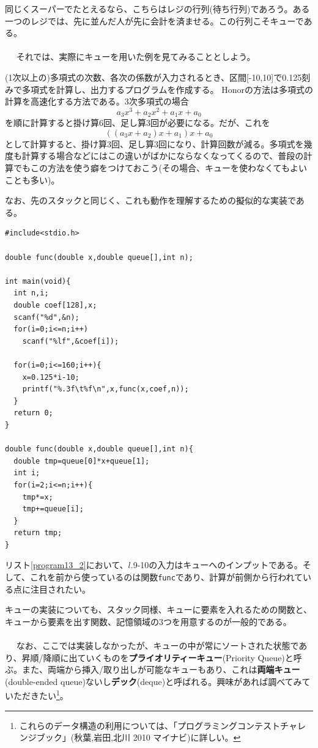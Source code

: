 同じくスーパーでたとえるなら、こちらはレジの行列(待ち行列)であろう。ある一つのレジでは、先に並んだ人が先に会計を済ませる。この行列こそキューである。
\\ \\　
それでは、実際にキューを用いた例を見てみることとしよう。
\begin{boxnote}
\begin{multicols}{2}
(1次以上の)多項式の次数、各次の係数が入力されるとき、区間[-10,10]で0.125刻みで多項式を計算し、出力するプログラムを作成する。
Honorの方法は多項式の計算を高速化する方法である。3次多項式の場合
\[
a_3x^3+a_2x^2+a_1x+a_0
\]
を順に計算すると掛け算6回、足し算3回が必要になる。だが、これを
\[
\left(\left(a_3x+a_2\right)x+a_1\right)x+a_0
\]
として計算すると、掛け算3回、足し算3回になり、計算回数が減る。多項式を幾度も計算する場合などにはこの違いがばかにならなくなってくるので、普段の計算でもこの方法を使う癖をつけておこう(その場合、キューを使わなくてもよいことも多い)。

なお、先のスタックと同じく、これも動作を理解するための擬似的な実装である。
\begin{lstlisting}[caption=Honorの方法(キュー利用),label=program13_2]
#include<stdio.h>

double func(double x,double queue[],int n);

int main(void){
  int n,i;
  double coef[128],x;
  scanf("%d",&n);
  for(i=0;i<=n;i++)
    scanf("%lf",&coef[i]);
  
  for(i=0;i<=160;i++){
    x=0.125*i-10;
    printf("%.3f\t%f\n",x,func(x,coef,n));
  }
  return 0;
}

double func(double x,double queue[],int n){
  double tmp=queue[0]*x+queue[1];
  int i;
  for(i=2;i<=n;i++){
    tmp*=x;
    tmp+=queue[i];
  }
  return tmp;
}
\end{lstlisting}
\end{multicols}
\end{boxnote}

リスト\ref{program13_2}において、$l$.9-10の入力はキューへのインプットである。そして、これを前から使っているのは関数\verb|func|であり、計算が前側から行われている点に注目されたい。

キューの実装についても、スタック同様、キューに要素を入れるための関数と、キューから要素を出す関数、記憶領域の3つを用意するのが一般的である。
\\ \\　
なお、ここでは実装しなかったが、キューの中が常にソートされた状態であり、昇順/降順に出ていくものを\textbf{プライオリティーキュー}(Priority Queue)と呼ぶ。また、両端から挿入/取り出しが可能なキューもあり、これは\textbf{両端キュー}(double-ended queue)ないし\textbf{デック}(deque)と呼ばれる。興味があれば調べてみていただきたい\footnote{これらのデータ構造の利用については、「プログラミングコンテストチャレンジブック」(秋葉,岩田,北川 2010 マイナビ)に詳しい。}。


